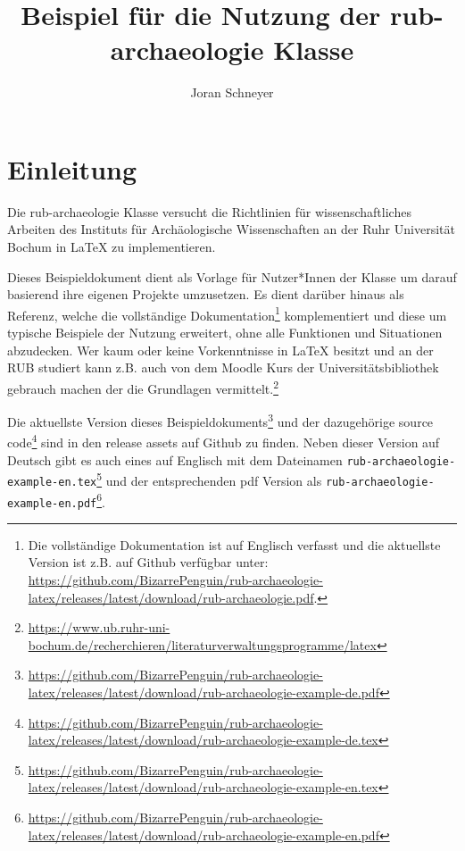 \documentclass{rub-archaeologie}
\title{Beispiel für die Nutzung der \textsf{rub-archaeologie} Klasse}
\author{Joran Schneyer}
\begin{document}
    \maketitle

    \tableofcontents
    \clearpage

    \section{Einleitung}
    Die \textsf{rub-archaeologie} Klasse versucht die Richtlinien für wissenschaftliches Arbeiten des Instituts für Archäologische Wissenschaften an der Ruhr Universität Bochum in \LaTeX{} zu implementieren.

    Dieses Beispieldokument dient als Vorlage für Nutzer*Innen der Klasse um darauf basierend ihre eigenen Projekte umzusetzen. Es dient darüber hinaus als Referenz, welche die vollständige Dokumentation\footnote{Die vollständige Dokumentation ist auf Englisch verfasst und die aktuellste Version ist z.B. auf Github verfügbar unter: \url{https://github.com/BizarrePenguin/rub-archaeologie-latex/releases/latest/download/rub-archaeologie.pdf}.} komplementiert und diese um typische Beispiele der Nutzung erweitert, ohne alle Funktionen und Situationen abzudecken. Wer kaum oder keine Vorkenntnisse in \LaTeX{} besitzt und an der RUB studiert kann z.B. auch von dem Moodle Kurs der Universitätsbibliothek gebrauch machen der die Grundlagen vermittelt.\footnote{\url{https://www.ub.ruhr-uni-bochum.de/recherchieren/literaturverwaltungsprogramme/latex}}

    Die aktuellste Version dieses Beispieldokuments\footnote{\url{https://github.com/BizarrePenguin/rub-archaeologie-latex/releases/latest/download/rub-archaeologie-example-de.pdf}} und der dazugehörige source code\footnote{\url{https://github.com/BizarrePenguin/rub-archaeologie-latex/releases/latest/download/rub-archaeologie-example-de.tex}} sind in den release assets auf Github zu finden. Neben dieser Version auf Deutsch gibt es auch eines auf Englisch mit dem Dateinamen \texttt{rub-archaeologie-example-en.tex}\footnote{\url{https://github.com/BizarrePenguin/rub-archaeologie-latex/releases/latest/download/rub-archaeologie-example-en.tex}} und der entsprechenden pdf Version als \texttt{rub-archaeologie-example-en.pdf}\footnote{\url{https://github.com/BizarrePenguin/rub-archaeologie-latex/releases/latest/download/rub-archaeologie-example-en.pdf}}.
\end{document}
